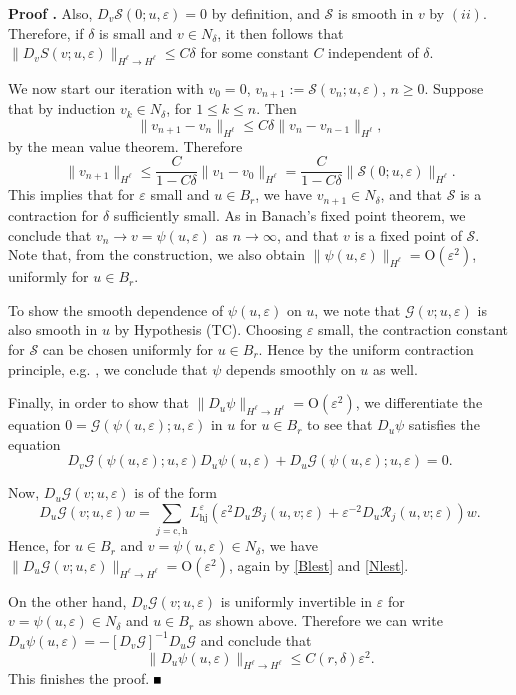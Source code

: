 \documentclass[10pt]{article}
\newenvironment{Proof}[1][\unskip]%
 {\begin{trivlist} \item[]{\bf Proof #1. }}%
 {\hspace*{\fill}$\rule{.4\baselineskip}{.4\baselineskip}$\end{trivlist}}
\newcommand{\rmO}{\mathrm{O}}
\newcommand{\eps}{\varepsilon}
\newcommand{\G}{\mathcal{G}}
\newcommand{\cS}{\mathcal{S}}
\newcommand{\Rm}{\mathcal{R}}
\begin{document}
\begin{Proof}
Also, $D_v\cS(0;u,\eps) = 0$ by definition, and $\cS$ is smooth in $v$ by $(ii)$. Therefore, if $\delta$ is small and $v\in N_\delta$, it then follows that $\|D_vS(v;u,\eps)\|_{H^\ell \to H^\ell} \le C\delta$ for some constant $C$ independent of $\delta$.

We now start our iteration with $v_0 = 0$, $v_{n+1} := \cS(v_n;u,\eps)$, $n\ge 0$. Suppose that by induction $v_k \in N_\delta$, for $1\le k \le n$. Then
\[
\|v_{n+1}-v_n\|_{H^\ell} \le C\delta\|v_n-v_{n-1}\|_{H^\ell},
\]
by the mean value theorem. Therefore
\[
\|v_{n+1}\|_{H^\ell} \le \frac{C}{1-C\delta}\|v_1-v_0\|_{H^\ell} = \frac{C}{1-C\delta}\|\cS(0;u,\eps)\|_{H^\ell}.
\]
This implies that for $\eps$ small and $u \in B_r$, we have $v_{n+1} \in N_\delta$, and that $\cS$ is a contraction for $\delta$ sufficiently small. As in Banach's fixed point theorem, we conclude that $v_n \to v = \psi(u,\eps)$ as $n\to \infty$, and that $v$ is a fixed point of $\cS$. Note that, from the construction, we also obtain $\|\psi(u,\eps)\|_{H^\ell} = \rmO(\eps^2)$, uniformly for $u\in B_r$. 

To show the smooth dependence of $\psi(u,\eps)$ on $u$, we note that $\G(v;u,\eps)$ is also smooth in $u$ by Hypothesis (TC). Choosing $\eps$ small, the contraction constant for $\cS$ can be chosen uniformly for $u \in B_r$. Hence by the uniform contraction principle, e.g. \cite[Thm 1.244]{chicone2006ordinary}, we conclude that $\psi$ depends smoothly on $u$ as well.

Finally, in order to show that $\|D_u\psi\|_{H^\ell \to H^\ell} = \rmO(\eps^2)$, we differentiate the equation $0 = \G(\psi(u,\eps);u,\eps)$ in $u$ for $u\in B_r$ to see that $D_u\psi$ satisfies the equation
\[
D_v\G(\psi(u,\eps); u,\eps)  D_u\psi(u,\eps) + D_u\G(\psi(u,\eps);u,\eps) = 0.
\]

Now, $D_u\G(v;u,\eps)$ is of the form
\[
D_u\G(v;u,\eps) w =  \sum_{j=\mathrm{c,h}} L_\mathrm{hj}^\eps (\eps^2 D_u \mathcal{B}_j(u,v;\eps) + \eps^{-2} D_u\Rm_j(u,v;\eps) ) w.
\]
Hence, for $u \in B_r$ and $v=\psi(u,\eps) \in N_\delta$, we have $\|D_u\G(v;u,\eps)\|_{H^\ell \to H^\ell} = \rmO(\eps^2)$, again by \eqref{Blest} and \eqref{Nlest}.

On the other hand, $D_v\G(v;u,\eps)$ is uniformly invertible in $\eps$ for $v=\psi(u,\eps)\in N_\delta$ and $u\in B_r$ as shown  above. Therefore we can write $D_u\psi(u,\eps) = -[D_v\G]^{-1} D_u\G $ and conclude that 
\[
\|D_u\psi(u,\eps)\|_{H^\ell \to H^\ell} \le C(r,\delta)\eps^2.
\] This finishes the proof.
\end{Proof}
\end{document}
